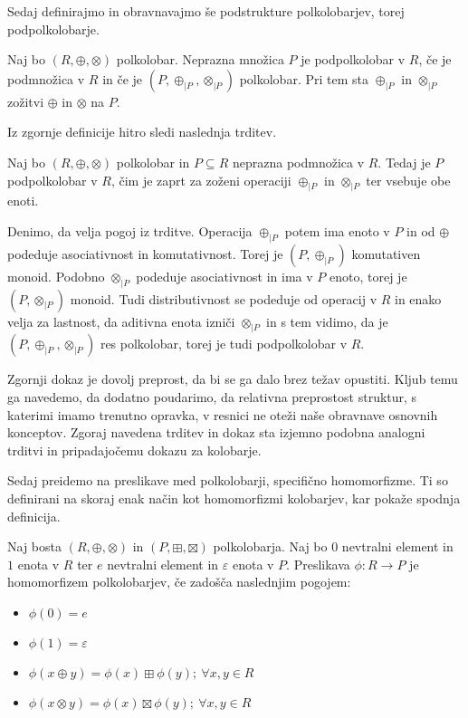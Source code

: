\documentclass[mat1]{fmfdelo}
\newcommand{\map}[3]{\ensuremath{{#1}:{#2}\rightarrow{#3}}}
\begin{document}
Sedaj definirajmo in obravnavajmo še podstrukture polkolobarjev, torej podpolkolobarje.

\begin{definicija}
	Naj bo $(R, \oplus, \otimes)$ polkolobar. Neprazna množica $P$ je podpolkolobar v $R$, če je podmnožica v $R$ in če je $(P, \oplus_{|P}, \otimes_{|P})$ polkolobar. Pri tem sta $\oplus_{|P}$ in $\otimes_{|P}$ zožitvi $\oplus$ in $\otimes$ na $P$.
\end{definicija}

Iz zgornje definicije hitro sledi naslednja trditev.

\begin{trditev}
	Naj bo $(R, \oplus, \otimes)$ polkolobar in $P\subseteq R$ neprazna podmnožica v $R$. Tedaj je $P$ podpolkolobar v $R$, čim je zaprt za zoženi operaciji $\oplus_{|P}$ in $\otimes_{|P}$ ter vsebuje obe enoti.
\end{trditev}
\begin{dokaz}
	Denimo, da velja pogoj iz trditve. Operacija $\oplus_{|P}$ potem ima enoto v $P$ in od $\oplus$ podeduje asociativnost in komutativnost. Torej je $(P, \oplus_{|P})$ komutativen monoid. Podobno $\otimes_{|P}$ podeduje asociativnost in ima v $P$ enoto, torej je $(P, \otimes_{|P})$ monoid.
	Tudi distributivnost se podeduje od operacij v $R$ in enako velja za lastnost, da aditivna enota izniči $\otimes_{|P}$ in s tem vidimo, da je $(P, \oplus_{|P}, \otimes_{|P})$ res polkolobar, torej je tudi podpolkolobar v $R$.
\end{dokaz}

Zgornji dokaz je dovolj preprost, da bi se ga dalo brez težav opustiti. Kljub temu ga navedemo, da dodatno poudarimo, da relativna preprostost struktur, s katerimi imamo trenutno opravka, v resnici ne oteži naše obravnave osnovnih konceptov. Zgoraj navedena trditev in dokaz sta izjemno podobna analogni trditvi in pripadajočemu dokazu za kolobarje.
	
Sedaj preidemo na preslikave med polkolobarji, specifično homomorfizme. Ti so definirani na skoraj enak način kot homomorfizmi kolobarjev, kar pokaže spodnja definicija.
	
\begin{definicija}
	Naj bosta $(R, \oplus, \otimes)$ in $(P, \boxplus, \boxtimes)$  polkolobarja. Naj bo $0$ nevtralni element in $1$ enota v $R$ ter $e$ nevtralni element in $\varepsilon$ enota v $P$. Preslikava $\map{\phi}{R}{P}$ je homomorfizem polkolobarjev, če zadošča naslednjim pogojem:
	\begin{itemize}
		\item $\phi(0) = e$
		\item $\phi(1) = \varepsilon$
		\item $\phi(x \oplus y) = \phi(x) \boxplus\phi(y) ;~\forall x, y\in R$
		\item $\phi(x \otimes y) = \phi(x) \boxtimes\phi(y) ;~\forall x, y\in R$
	\end{itemize}
\end{definicija}
\end{document}

